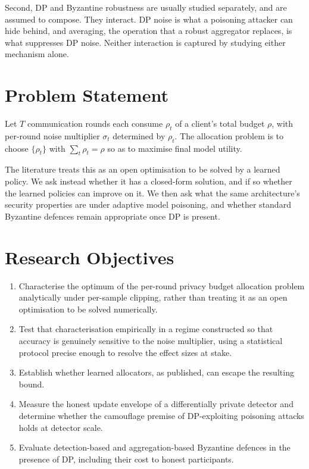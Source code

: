 \vspace{10pt}

Second, DP and Byzantine robustness are usually studied separately, and are
assumed to compose. They interact. DP noise is what a poisoning attacker can
hide behind, and averaging, the operation that a robust aggregator replaces, is
what suppresses DP noise. Neither interaction is captured by studying either
mechanism alone.

\section{Problem Statement}

Let $T$ communication rounds each consume $\rho_t$ of a client's total budget
$\rho$, with per-round noise multiplier $\sigma_t$ determined by $\rho_t$. The
allocation problem is to choose $\{\rho_t\}$ with $\sum_t \rho_t = \rho$ so as to
maximise final model utility.

\vspace{10pt}

The literature treats this as an open optimisation to be solved by a learned
policy. We ask instead whether it has a closed-form solution, and if so whether
the learned policies can improve on it. We then ask what the same architecture's
security properties are under adaptive model poisoning, and whether standard
Byzantine defences remain appropriate once DP is present.

\section{Research Objectives}

\begin{enumerate}[label=O\arabic*.]
  \item Characterise the optimum of the per-round privacy budget allocation
  problem analytically under per-sample clipping, rather than treating it as an
  open optimisation to be solved numerically.
  \item Test that characterisation empirically in a regime constructed so that
  accuracy is genuinely sensitive to the noise multiplier, using a statistical
  protocol precise enough to resolve the effect sizes at stake.
  \item Establish whether learned allocators, as published, can escape the
  resulting bound.
  \item Measure the honest update envelope of a differentially private detector
  and determine whether the camouflage premise of DP-exploiting poisoning
  attacks holds at detector scale.
  \item Evaluate detection-based and aggregation-based Byzantine defences in the
  presence of DP, including their cost to honest participants.
\end{enumerate}

